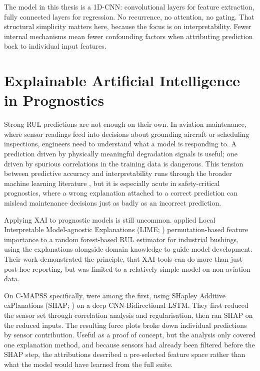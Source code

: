 The model in this thesis is a 1D-CNN: convolutional layers for feature extraction, fully connected layers for regression. No recurrence, no attention, no gating. That structural simplicity matters here, because the focus is on interpretability. Fewer internal mechanisms mean fewer confounding factors when attributing prediction back to individual input features.

\section{Explainable Artificial Intelligence in Prognostics}
Strong RUL predictions are not enough on their own. In aviation maintenance, where sensor readings feed into decisions about grounding aircraft or scheduling inspections, engineers need to understand what a model is responding to. A prediction driven by physically meaningful degradation signals is useful; one driven by spurious correlations in the training data is dangerous. This tension between predictive accuracy and interpretability runs through the broader machine learning literature \cite{Rudin2019}, but it is especially acute in safety-critical prognostics, where a wrong explanation attached to a correct prediction can mislead maintenance decisions just as badly as an incorrect prediction.

Applying XAI to prognostic models is still uncommon. \cite{Serradilla2020} applied Local Interpretable Model-agnostic Explanations (LIME; \cite{ribeiro2016modelagnosticinterpretabilitymachinelearning}) permutation-based feature importance to a random forest-based RUL estimator for industrial bushings, using the explanations alongside domain knowledge to guide model development. Their work demonstrated the principle, that XAI tools can do more than just post-hoc reporting, but was limited to a relatively simple model on non-aviation data.

On C-MAPSS specifically, \cite{Hong2020} were among the first, using SHapley Additive exPlanations (SHAP; \citep{lundberg2017unified}) on a deep CNN-Bidirectional LSTM. They first reduced the sensor set through correlation analysis and regularisation, then ran SHAP on the reduced inputs. The resulting force plots broke down individual predictions by sensor contribution. Useful as a proof of concept, but the analysis only covered one explanation method, and because sensors had already been filtered before the SHAP step, the attributions described a pre-selected feature space rather than what the model would have learned from the full suite.

